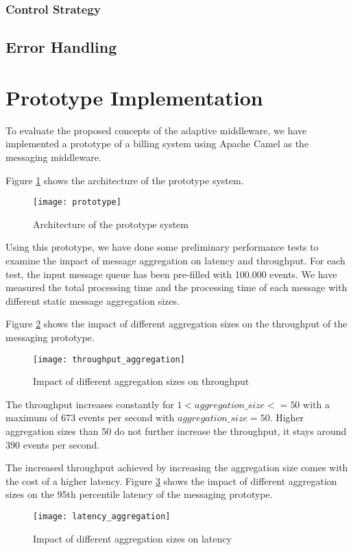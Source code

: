 \subsubsection{Control Strategy}

\subsection{Error Handling}

\section{Prototype Implementation}
To evaluate the proposed concepts of the adaptive middleware, we have implemented a prototype of a billing system using Apache Camel \citep{apachecamel} as the messaging middleware.

Figure \ref{fig:message_prototype} shows the architecture of the prototype system.

\begin{figure}[h!]
	\centering
	\texttt{[image: prototype]}
	\caption{Architecture of the prototype system}
	\label{fig:message_prototype}
\end{figure}

Using this prototype, we have done some preliminary performance tests to examine the impact of message aggregation on latency and throughput. For each test, the input message queue has been pre-filled with 100.000 events. We have measured the total processing time and the processing time of each message with different static message aggregation sizes.

Figure \ref{fig:throughput_aggregation} shows the impact of different aggregation sizes on the throughput of the messaging prototype.
\begin{figure}[htbp]
	\centering
	\texttt{[image: throughput\_aggregation]}
	\caption{Impact of different aggregation sizes on throughput}
	\label{fig:throughput_aggregation}
\end{figure}
The throughput increases constantly for $1<aggregation\_size<=50$ with a maximum of 673 events per second with $aggregation\_size=50$. Higher aggregation sizes than 50 do not further increase the throughput, it stays around 390 events per second.

The increased throughput achieved by increasing the aggregation size comes with the cost of a higher latency. Figure \ref{fig:latency_aggregation} shows the impact of different aggregation sizes on the 95th percentile latency of the messaging prototype. 
\begin{figure}[htbp]
	\centering
	\texttt{[image: latency\_aggregation]}
	\caption{Impact of different aggregation sizes on latency}
	\label{fig:latency_aggregation}
\end{figure}

